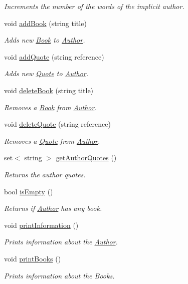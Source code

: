 \begin{DoxyCompactItemize}
\begin{DoxyCompactList}\small\item\em Increments the number of the words of the implicit author. \end{DoxyCompactList}\item 
void \hyperlink{class_author_a5836c0e00e740d4e9e9049e94f032cc3}{add\-Book} (string title)
\begin{DoxyCompactList}\small\item\em Adds new \hyperlink{class_book}{Book} to \hyperlink{class_author}{Author}. \end{DoxyCompactList}\item 
void \hyperlink{class_author_a8605dbbab320ca251f3c64e782cf40b3}{add\-Quote} (string reference)
\begin{DoxyCompactList}\small\item\em Adds new \hyperlink{class_quote}{Quote} to \hyperlink{class_author}{Author}. \end{DoxyCompactList}\item 
void \hyperlink{class_author_ad48c2d5ae47d521bf5d4aa638bb86976}{delete\-Book} (string title)
\begin{DoxyCompactList}\small\item\em Removes a \hyperlink{class_book}{Book} from \hyperlink{class_author}{Author}. \end{DoxyCompactList}\item 
void \hyperlink{class_author_a41078931f76f02641f92521a3da5b286}{delete\-Quote} (string reference)
\begin{DoxyCompactList}\small\item\em Removes a \hyperlink{class_quote}{Quote} from \hyperlink{class_author}{Author}. \end{DoxyCompactList}\item 
set$<$ string $>$ \hyperlink{class_author_a81435140eb694eb7ed54ea567aa38984}{get\-Author\-Quotes} ()
\begin{DoxyCompactList}\small\item\em Returns the author quotes. \end{DoxyCompactList}\item 
bool \hyperlink{class_author_ab0752a3f061a07c6460e52e4386ea5c3}{is\-Empty} ()
\begin{DoxyCompactList}\small\item\em Returns if \hyperlink{class_author}{Author} has any book. \end{DoxyCompactList}\item 
void \hyperlink{class_author_a9dff52e2a8bd67ff4509eb00f9235155}{print\-Information} ()
\begin{DoxyCompactList}\small\item\em Prints information about the \hyperlink{class_author}{Author}. \end{DoxyCompactList}\item 
void \hyperlink{class_author_a108714e7e120b05eaf431bb4a55b9383}{print\-Books} ()
\begin{DoxyCompactList}\small\item\em Prints information about the Books. \end{DoxyCompactList}\end{DoxyCompactItemize}
